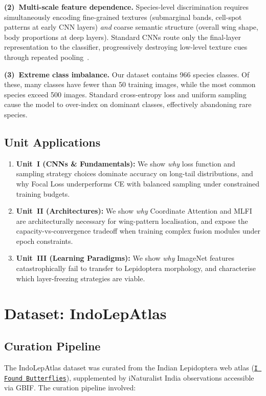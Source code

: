 \documentclass[10pt, twocolumn]{article}
\begin{document}
\textbf{(2)~Multi-scale feature dependence.}
Species-level discrimination requires simultaneously encoding fine-grained textures (submarginal bands, cell-spot patterns at early CNN layers) \emph{and} coarse semantic structure (overall wing shape, body proportions at deep layers). Standard CNNs route only the final-layer representation to the classifier, progressively destroying low-level texture cues through repeated pooling~\cite{yuan2025fgbnet}.

\textbf{(3)~Extreme class imbalance.}
Our dataset contains 966 species classes. Of these, many classes have fewer than 50 training images, while the most common species exceed 500 images. Standard cross-entropy loss and uniform sampling cause the model to over-index on dominant classes, effectively abandoning rare species.

\subsection{Unit Applications}

\begin{enumerate}[leftmargin=*, topsep=2pt, itemsep=1pt]
    \item \textbf{Unit~I (CNNs \& Fundamentals):} We show \emph{why} loss function and sampling strategy choices dominate accuracy on long-tail distributions, and why Focal Loss underperforms CE with balanced sampling under constrained training budgets.
    \item \textbf{Unit~II (Architectures):} We show \emph{why} Coordinate Attention and MLFI are architecturally necessary for wing-pattern localisation, and expose the capacity-vs-convergence tradeoff when training complex fusion modules under epoch constraints.
    \item \textbf{Unit~III (Learning Paradigms):} We show \emph{why} ImageNet features catastrophically fail to transfer to Lepidoptera morphology, and characterise which layer-freezing strategies are viable.
\end{enumerate}

\section{Dataset: IndoLepAtlas}
\label{sec:dataset}

\subsection{Curation Pipeline}
The IndoLepAtlas dataset was curated from the Indian Lepidoptera web atlas (\texttt{\href{https://www.ifoundbutterflies.org/}{I Found Butterflies}}), supplemented by iNaturalist India observations accessible via GBIF. The curation pipeline involved:
\end{document}
